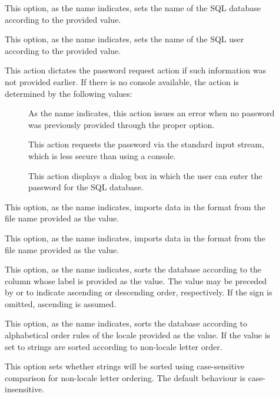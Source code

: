 \begin{description}
\begin{description}
\item[] This option, as the name indicates, sets the name of the SQL database according to the provided value.

\item[] This option, as the name indicates, sets the name of the SQL user according to the provided value.

\item[] This action dictates the password request action if such information was not provided earlier. If there is no console available, the action is determined by the following values:

\begin{description}
\item[] As the name indicates, this action issues an error when no password was previously provided through the proper option.

\item[] This action requests the password via the standard input stream, which is less secure than using a console.

\item[] This action displays a dialog box in which the user can enter the password for the SQL database.
\end{description}

\item[] This option, as the name indicates, imports data in the  format from the file name provided as the value.

\item[] This option, as the name indicates, imports data in the  format from the file name provided as the value.

\item[] This option, as the name indicates, sorts the database according to the column whose label is provided as the value. The value may be preceded by \rbox{+} or \rbox{-} to indicate ascending or descending order, respectively. If the sign is omitted, ascending is assumed.

\item[] This option, as the name indicates, sorts the database according to alphabetical order rules of the locale provided as the value. If the value is set to  strings are sorted according to non-locale letter order.

\item[] This option sets whether strings will be sorted using case-sensitive comparison for non-locale letter ordering. The default behaviour is case-insensitive.


\end{description}
\end{description}
